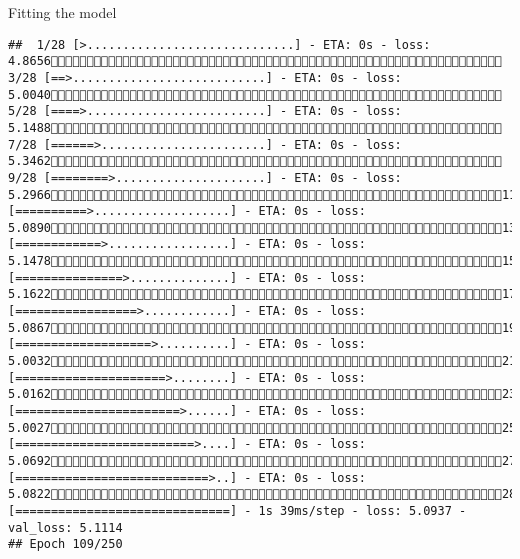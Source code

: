 \documentclass[
  ignorenonframetext,
]{beamer}
\begin{document}
\begin{frame}[fragile]{Fitting the model}
\begin{verbatim}
##  1/28 [>.............................] - ETA: 0s - loss: 4.8656 3/28 [==>...........................] - ETA: 0s - loss: 5.0040 5/28 [====>.........................] - ETA: 0s - loss: 5.1488 7/28 [======>.......................] - ETA: 0s - loss: 5.3462 9/28 [========>.....................] - ETA: 0s - loss: 5.296611/28 [==========>...................] - ETA: 0s - loss: 5.089013/28 [============>.................] - ETA: 0s - loss: 5.147815/28 [===============>..............] - ETA: 0s - loss: 5.162217/28 [=================>............] - ETA: 0s - loss: 5.086719/28 [===================>..........] - ETA: 0s - loss: 5.003221/28 [=====================>........] - ETA: 0s - loss: 5.016223/28 [=======================>......] - ETA: 0s - loss: 5.002725/28 [=========================>....] - ETA: 0s - loss: 5.069227/28 [===========================>..] - ETA: 0s - loss: 5.082228/28 [==============================] - 1s 39ms/step - loss: 5.0937 - val_loss: 5.1114
## Epoch 109/250

\end{verbatim}
\end{frame}
\end{document}

